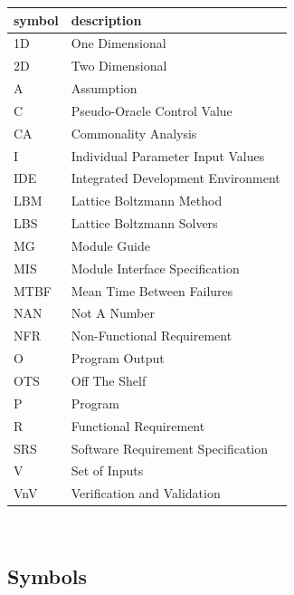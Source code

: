 \documentclass[12pt, titlepage]{article}
\begin{document}
\renewcommand{\arraystretch}{1.2}
\begin{tabular}{l l} 
  \toprule		
  \textbf{symbol} & \textbf{description}\\
  \midrule 
  1D & One Dimensional\\
  2D & Two Dimensional\\
  A & Assumption\\
  C & Pseudo-Oracle Control Value\\
  CA & Commonality Analysis\\
  I & Individual Parameter Input Values\\
  IDE & Integrated Development Environment\\
  LBM & Lattice Boltzmann Method\\
  LBS & Lattice Boltzmann Solvers\\
  MG & Module Guide\\
  MIS & Module Interface Specification\\
  MTBF & Mean Time Between Failures\\
  NAN & Not A Number\\
  NFR & Non-Functional Requirement\\
  O & Program Output\\
  OTS & Off The Shelf\\
  P & Program\\
  R & Functional Requirement\\
  SRS & Software Requirement Specification\\
  V & Set of Inputs\\
  VnV & Verification and Validation\\
  \bottomrule
\end{tabular}\\

\newpage

\subsection{Symbols}
\end{document}
